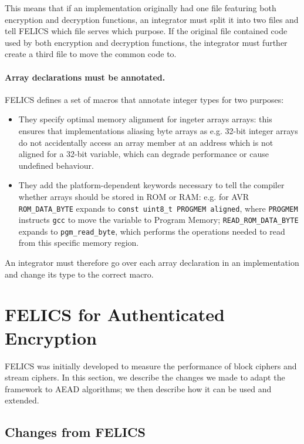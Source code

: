 \documentclass{article}
\begin{document}
This means that if an implementation originally had one file featuring
both encryption and decryption functions, an integrator must split it
into two files and tell FELICS which file serves which purpose.  If
the original file contained code used by both encryption and
decryption functions, the integrator must further create a third file
to move the common code to.

\paragraph{Array declarations must be annotated.}

FELICS defines a set of macros that annotate integer types for two
purposes:

\begin{itemize}
\item They specify optimal memory alignment for ingeter arrays arrays:
  this ensures that implementations aliasing byte arrays as
  e.g. 32-bit integer arrays do not accidentally access an array
  member at an address which is not aligned for a 32-bit variable,
  which can degrade performance or cause undefined behaviour.

\item They add the platform-dependent keywords necessary to tell the
  compiler whether arrays should be stored in ROM or RAM: e.g. for AVR
  \texttt{ROM\_DATA\_BYTE} expands to \texttt{const uint8\_t PROGMEM
    aligned}, where \texttt{PROGMEM} instructs \texttt{gcc} to move
  the variable to Program Memory; \texttt{READ\_ROM\_DATA\_BYTE}
  expands to \texttt{pgm\_read\_byte}, which performs the operations
  needed to read from this specific memory region.
\end{itemize}

An integrator must therefore go over each array declaration in an
implementation and change its type to the correct macro.

\section{FELICS for Authenticated Encryption}
\label{sec:felics-ae}

FELICS was initially developed to measure the performance of block
ciphers and stream ciphers.  In this section, we describe the changes
we made to adapt the framework to AEAD algorithms; we then describe
how it can be used and extended.

\subsection{Changes from FELICS}
\label{sec:felics-ae/diff-felics}
\end{document}
